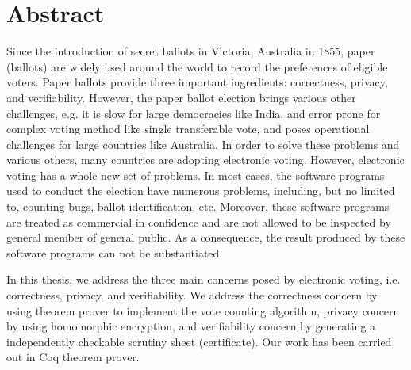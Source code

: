 \chapter*{Abstract}
\setlength{\parindent}{2em}
\setlength{\parskip}{1em}



Since the introduction of secret ballots in Victoria, Australia in 1855, 
paper (ballots) are widely used around the world to record 
the preferences of eligible voters. Paper ballots provide three 
important ingredients: correctness, privacy, and verifiability. 
However, the paper ballot election brings various  other challenges, e.g. 
it is slow for large democracies like India,  and error prone for complex voting method 
like single transferable vote, and poses operational challenges for 
large countries like Australia. In order to solve these problems and various others, 
many countries are adopting electronic voting. However, 
electronic voting has a whole new set of problems. In most cases, the software 
programs used to conduct the election have numerous problems, including, but no limited to, 
counting bugs, ballot identification, etc. Moreover, 
these software programs are treated as commercial in confidence and 
are not allowed to be inspected by general member of general public. 
As a consequence, the result produced by these software programs 
can not be substantiated.

In this thesis, we address the three main concerns posed by electronic voting, i.e. 
correctness, privacy, and verifiability. We address the correctness concern by using 
theorem prover to implement the vote counting algorithm, 
privacy concern by using homomorphic encryption, and verifiability concern 
by generating a independently checkable scrutiny sheet (certificate). Our work 
has been carried out in Coq theorem prover.

